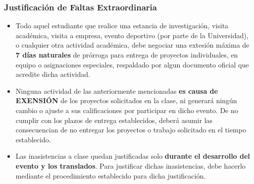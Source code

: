 

\begin{frame}
\frametitle{Justificaci\'on de Faltas Extraordinaria}
\begin{itemize}
\item Todo aquel estudiante que realice una estancia de investigaci\'on, visita acad\'emica, visita a empresa, evento deportivo (por parte de la Universidad), o cualquier otra actividad acad\'emica, debe negociar una extesi\'on m\'axima de \textbf{7 d\'ias naturales} de pr\'orroga para entrega de proyectos individuales, en equipo o asignaciones especiales, respaldado por algun documento oficial que acredite dicha actividad. 
\item Ninguna actividad de las anteriormente mencionadas \textbf{es causa de EXENSI\'ON} de los proyectos solicitados en la clase, ni generar\'a ning\'un cambio o ajuste a sus calificaciones por participar en dicho evento.  De no cumplir con los plazos de entrega establecidos, deber\'a asumir las consecuencian de no entregar los proyectos o trabajo solicitado en el tiempo establecido.
\item Las inasistencias a clase quedan justificadas solo \textbf{durante el desarrollo del evento y los translados}. Para justificar dichas inasistencias, debe hacerlo mediante el procedimiento establecido para dicha justificaci\'on.

\end{itemize}

\end{frame}
